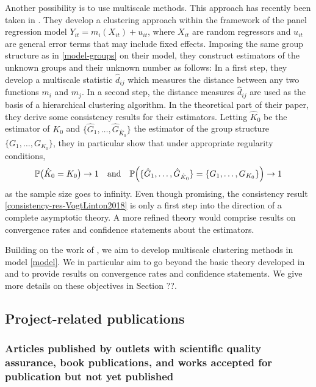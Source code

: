 \documentclass[a4paper,12pt]{article}
\begin{document}
Another possibility is to use multiscale methods. This approach has recently been taken in \cite{VogtLinton2018}. They develop a clustering approach within the framework of the panel regression model $Y_{it} = m_i(X_{it}) + u_{it}$, where $X_{it}$ are random regressors and $u_{it}$ are general error terms that may include fixed effects. Imposing the same group structure as in \eqref{model-groups} on their  model, they construct estimators of the unknown groups and their unknown number as follows: In a first step, they develop a multiscale statistic $\hat{d}_{ij}$ which measures the distance between any two functions $m_i$ and $m_j$. In a second step, the distance measures $\hat{d}_{ij}$ are used as the basis of a hierarchical clustering algorithm. In the theoretical part of their paper, they derive some consistency results for their estimators. Letting $\hat{K}_0$ be the estimator of $K_0$ and $\{ \hat{G}_1,\ldots,\hat{G}_{\hat{K}_0} \}$ the estimator of the group structure $\{ G_1,\ldots,G_{K_0} \}$, they in particular show that under appropriate regularity conditions, 
\begin{equation}\label{consistency-res-VogtLinton2018}
\mathbb{P} \big( \hat{K}_0 = K_0 \big) \rightarrow 1 \quad \text{and} \quad \mathbb{P} \Big( \{ \hat{G}_1,\ldots,\hat{G}_{\hat{K}_0} \} = \{ G_1,\ldots,G_{K_0} \} \Big) \rightarrow 1 
\end{equation}
as the sample size goes to infinity. %
Even though promising, the consistency result \eqref{consistency-res-VogtLinton2018} is only a first step into the direction of a complete asymptotic theory. A more refined theory would comprise results on convergence rates and confidence statements about the estimators. 


Building on the work of \cite{VogtLinton2018}, we aim to develop multiscale clustering methods in model \eqref{model}. We in particular aim to go beyond the basic theory developed in \cite{VogtLinton2018} and to provide results on convergence rates and confidence statements. We give more details on these objectives in Section ??.  


\subsection{Project-related publications}


\subsubsection{Articles published by outlets with scientific quality assurance, book publications, and works accepted for publication but not yet published}
\end{document}

